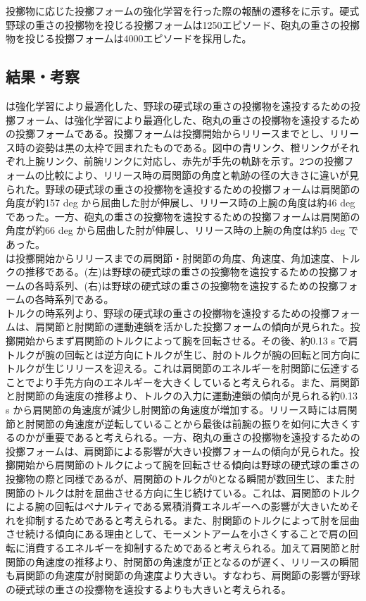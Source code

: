 投擲物に応じた投擲フォームの強化学習を行った際の報酬の遷移をに示す。硬式野球の重さの投擲物を投じる投擲フォームは1250エピソード、砲丸の重さの投擲物を投じる投擲フォームは4000エピソードを採用した。

\subsection{結果・考察}
は強化学習により最適化した、野球の硬式球の重さの投擲物を遠投するための投擲フォーム、は強化学習により最適化した、砲丸の重さの投擲物を遠投するための投擲フォームである。投擲フォームは投擲開始からリリースまでとし、リリース時の姿勢は黒の太枠で囲まれたものである。図中の青リンク、橙リンクがそれぞれ上腕リンク、前腕リンクに対応し、赤先が手先の軌跡を示す。2つの投擲フォームの比較により、リリース時の肩関節の角度と軌跡の径の大きさに違いが見られた。野球の硬式球の重さの投擲物を遠投するための投擲フォームは肩関節の角度が約157 deg から屈曲した肘が伸展し、リリース時の上腕の角度は約46 deg であった。一方、砲丸の重さの投擲物を遠投するための投擲フォームは肩関節の角度が約66 deg から屈曲した肘が伸展し、リリース時の上腕の角度は約5 deg であった。\\
は投擲開始からリリースまでの肩関節・肘関節の角度、角速度、角加速度、トルクの推移である。(左)は野球の硬式球の重さの投擲物を遠投するための投擲フォームの各時系列、(右)は野球の硬式球の重さの投擲物を遠投するための投擲フォームの各時系列である。\\
トルクの時系列より、野球の硬式球の重さの投擲物を遠投するための投擲フォームは、肩関節と肘関節の運動連鎖を活かした投擲フォームの傾向が見られた。投擲開始からまず肩関節のトルクによって腕を回転させる。その後、約0.13 s で肩トルクが腕の回転とは逆方向にトルクが生じ、肘のトルクが腕の回転と同方向にトルクが生じリリースを迎える。これは肩関節のエネルギーを肘関節に伝達することでより手先方向のエネルギーを大きくしていると考えられる。また、肩関節と肘関節の角速度の推移より、トルクの入力に運動連鎖の傾向が見られる約0.13 s から肩関節の角速度が減少し肘関節の角速度が増加する。リリース時には肩関節と肘関節の角速度が逆転していることから最後は前腕の振りを如何に大きくするのかが重要であると考えられる。一方、砲丸の重さの投擲物を遠投するための投擲フォームは、肩関節による影響が大きい投擲フォームの傾向が見られた。投擲開始から肩関節のトルクによって腕を回転させる傾向は野球の硬式球の重さの投擲物の際と同様であるが、肩関節のトルクが0となる瞬間が数回生じ、また肘関節のトルクは肘を屈曲させる方向に生じ続けている。これは、肩関節のトルクによる腕の回転はペナルティである累積消費エネルギーへの影響が大きいためそれを抑制するためであると考えられる。また、肘関節のトルクによって肘を屈曲させ続ける傾向にある理由として、モーメントアームを小さくすることで肩の回転に消費するエネルギーを抑制するためであると考えられる。加えて肩関節と肘関節の角速度の推移より、肘関節の角速度が正となるのが遅く、リリースの瞬間も肩関節の角速度が肘関節の角速度より大きい。すなわち、肩関節の影響が野球の硬式球の重さの投擲物を遠投するよりも大きいと考えられる。



